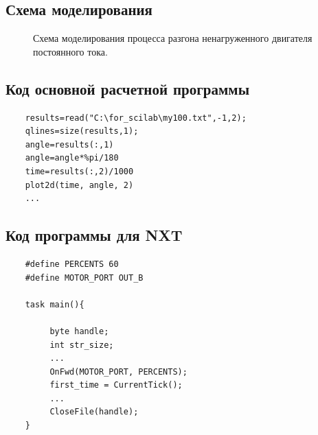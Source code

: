 \documentclass[12pt,titlepage,a4paper]{article}
\begin{document}
\subsection{Схема моделирования}
\begin{figure}[h]
	\noindent{}
	\caption{Схема моделирования процесса разгона ненагруженного двигателя постоянного тока.}
\end{figure}


\subsection{Код основной расчетной программы}
\begin{verbatim}
    results=read("C:\for_scilab\my100.txt",-1,2);
    qlines=size(results,1);
    angle=results(:,1)
    angle=angle*%pi/180
    time=results(:,2)/1000
    plot2d(time, angle, 2)
    ...
\end{verbatim}
\subsection{Код программы для NXT}
\begin{verbatim}
    #define PERCENTS 60
    #define MOTOR_PORT OUT_B

    task main(){

         byte handle;
         int str_size;
         ...
         OnFwd(MOTOR_PORT, PERCENTS);
         first_time = CurrentTick();
         ...
         CloseFile(handle);
    }
\end{verbatim}
\end{document}
